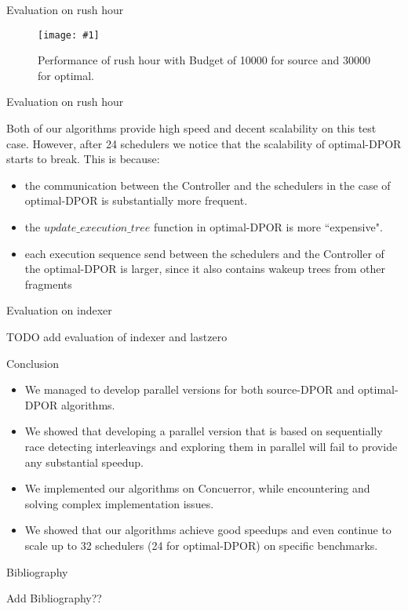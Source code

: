 \documentclass[9pt]{beamer}
\newcommand{\tracelong}[2]{
\begin{figure}[H]
\centering
\texttt{[image: \#1]}
\caption{#2}
\label{#2}
\end{figure}
}
\newcommand{\customGraph}[2]{
\begin{figure}[H]
\centering
\texttt{[image: \#1]}
\caption{#2}
\label{#2}
\end{figure}
}
\begin{document}
\iffalse
\begin{frame}{Evaluation on rush hour}


\tracelong{../img/rushhour.png}{Input of rush hour}


\end{frame}
\fi

\begin{frame}{Evaluation on rush hour}

\customGraph{../scripts/rush_hour_10000_combo_time.png}{Performance of rush hour with Budget of 10000 for source and 30000 for optimal.}


\end{frame}


\begin{frame}{Evaluation on rush hour}

Both of our algorithms provide high speed and decent scalability on this test case.
However, after 24 schedulers we notice that the scalability of optimal-DPOR starts to break. This is because:

\begin{itemize}
\item the communication between the Controller and the schedulers in the case of optimal-DPOR is substantially more frequent.
\item the $update\_execution\_tree$ function in optimal-DPOR is more ``expensive". 
\item each execution sequence send between the schedulers and the Controller of the optimal-DPOR is larger, since it also contains wakeup trees from other fragments
\end{itemize}

\end{frame}

\begin{frame}{Evaluation on indexer}

TODO add evaluation of indexer and lastzero

\end{frame}

\begin{frame}{Conclusion}

\begin{itemize}
\item We managed to develop parallel versions for both source-DPOR and optimal-DPOR algorithms.
\item We showed that developing a parallel version that is based on sequentially race detecting interleavings and exploring them in parallel will fail to provide any substantial speedup.
\item We implemented our algorithms on Concuerror, while encountering and solving complex implementation issues.
\item We showed that our algorithms achieve good speedups and even continue to scale up to 32 schedulers (24 for optimal-DPOR) on specific benchmarks.
\end{itemize}

\end{frame}


\begin{frame}{Bibliography}

Add Bibliography??

\end{frame}


\begin{frame}{}



\end{frame}
\end{document}
